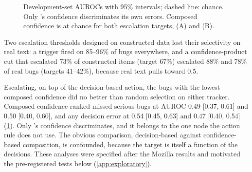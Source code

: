 \begin{figure}[t]
\centering
{}
\caption{Development-set AUROCs with 95\% intervals; dashed line: chance.
Only \choice{}'s confidence discriminates its own errors. Composed
confidence is at chance for both escalation targets, (A) and (B).}
\label{fig:forest}
\end{figure}

 Two escalation thresholds designed
on constructed data lost their selectivity on real text: a \choice{}
trigger fired on 85--96\% of bugs everywhere, and a confidence-product cut
that escalated 73\% of constructed items (target 67\%) escalated 88\% and
78\% of real bugs (targets 41--42\%), because real text pulls \noul{}
toward 0.5.

Escalating, on top of the decision-based action, the bugs with the lowest
composed confidence did no better than random selection on either tracker.
Composed confidence ranked missed serious bugs at AUROC 0.49 [0.37, 0.61]
and 0.50 [0.40, 0.60], and any decision error at 0.54 [0.45, 0.63] and
0.47 [0.40, 0.54] (\cref{fig:forest}). Only \choice{}'s confidence
discriminates, and it belongs to the one node the action rule does not
use. The obvious comparison, decision-based against
confidence-based composition, is confounded, because the target is itself
a function of the decisions. These analyses were specified after the
Mozilla results and motivated the pre-registered tests below
(\cref{app:exploratory}).

